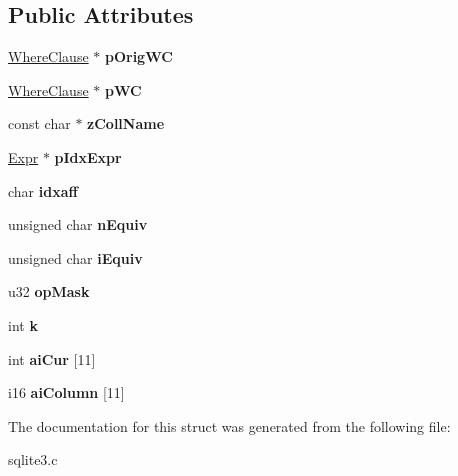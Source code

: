 \subsection*{Public Attributes}
\begin{DoxyCompactItemize}
\item 
\hyperlink{structWhereClause}{Where\+Clause} $\ast$ {\bfseries p\+Orig\+WC}\hypertarget{structWhereScan_a848dc138a80d4e16ce5044e3d3125831}{}\label{structWhereScan_a848dc138a80d4e16ce5044e3d3125831}

\item 
\hyperlink{structWhereClause}{Where\+Clause} $\ast$ {\bfseries p\+WC}\hypertarget{structWhereScan_a255e78bbf5eb2aafe98d5f0285c1987c}{}\label{structWhereScan_a255e78bbf5eb2aafe98d5f0285c1987c}

\item 
const char $\ast$ {\bfseries z\+Coll\+Name}\hypertarget{structWhereScan_aa21062fab71aadb240a866ff0b5e1a98}{}\label{structWhereScan_aa21062fab71aadb240a866ff0b5e1a98}

\item 
\hyperlink{structExpr}{Expr} $\ast$ {\bfseries p\+Idx\+Expr}\hypertarget{structWhereScan_ae93d54128df8188241c2432b0c394e64}{}\label{structWhereScan_ae93d54128df8188241c2432b0c394e64}

\item 
char {\bfseries idxaff}\hypertarget{structWhereScan_ada63a4e977c20a66b858e4b182ff8f87}{}\label{structWhereScan_ada63a4e977c20a66b858e4b182ff8f87}

\item 
unsigned char {\bfseries n\+Equiv}\hypertarget{structWhereScan_a80ee79b4e2809c0310a892e93ba5dcfe}{}\label{structWhereScan_a80ee79b4e2809c0310a892e93ba5dcfe}

\item 
unsigned char {\bfseries i\+Equiv}\hypertarget{structWhereScan_a52812709e4b6257a3084dd091ddaf568}{}\label{structWhereScan_a52812709e4b6257a3084dd091ddaf568}

\item 
u32 {\bfseries op\+Mask}\hypertarget{structWhereScan_a52f27b144ffed79df3400868e52dd583}{}\label{structWhereScan_a52f27b144ffed79df3400868e52dd583}

\item 
int {\bfseries k}\hypertarget{structWhereScan_a51bec89116185e0a611cd4d7fed8847c}{}\label{structWhereScan_a51bec89116185e0a611cd4d7fed8847c}

\item 
int {\bfseries ai\+Cur} \mbox{[}11\mbox{]}\hypertarget{structWhereScan_a0795799165cb58df1402063f03daf1a6}{}\label{structWhereScan_a0795799165cb58df1402063f03daf1a6}

\item 
i16 {\bfseries ai\+Column} \mbox{[}11\mbox{]}\hypertarget{structWhereScan_a5a55fc1ad5f48ef922ea89c9603f8f38}{}\label{structWhereScan_a5a55fc1ad5f48ef922ea89c9603f8f38}

\end{DoxyCompactItemize}


The documentation for this struct was generated from the following file\+:\begin{DoxyCompactItemize}
\item 
sqlite3.\+c\end{DoxyCompactItemize}
